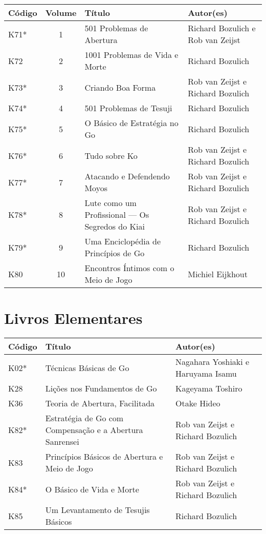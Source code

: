 \begin{longtable}{l|c|p{45mm}|p{25mm}} 
    \hline
    \textbf{Código} & \textbf{Volume} & \textbf{Título} & \textbf{Autor(es)} \\
    \hline \hline
    K71* & 1 & 501 Problemas de Abertura & Richard Bozulich e Rob van Zeijst \\
    \hline
    K72 & 2 & 1001 Problemas de Vida e Morte & Richard Bozulich \\
    \hline
    K73* & 3 & Criando Boa Forma & Rob van Zeijst e Richard Bozulich \\
    \hline
    K74* & 4 & 501 Problemas de Tesuji & Richard Bozulich \\
    \hline
    K75* & 5 & O Básico de Estratégia no Go & Richard Bozulich \\
    \hline
    K76* & 6 & Tudo sobre Ko & Rob van Zeijst e Richard Bozulich \\
    \hline
    K77* & 7 & Atacando e Defendendo Moyos & Rob van Zeijst e Richard Bozulich \\
    \hline
    K78* & 8 & Lute como um Profissional --- Os Segredos do Kiai & Rob van Zeijst e Richard Bozulich \\
    \hline
    K79* & 9 & Uma Enciclopédia de Princípios de Go & Richard Bozulich \\
    \hline
    K80 & 10 & Encontros Íntimos com o Meio de Jogo & Michiel Eijkhout \\
    \hline
\end{longtable}

\section{Livros Elementares}

\begin{longtable}{l|p{45mm}|p{25mm}} 
    \hline
    \textbf{Código} & \textbf{Título} & \textbf{Autor(es)} \\
    \hline \hline
    K02* & Técnicas Básicas de Go & Nagahara Yoshiaki e Haruyama Isamu \\
    \hline
    K28 & Lições nos Fundamentos de Go & Kageyama Toshiro \\
    \hline
    K36 & Teoria de Abertura, Facilitada & Otake Hideo \\
    \hline
    K82* & Estratégia de Go com Compensação e a Abertura Sanrensei & Rob van Zeijst e Richard Bozulich \\
    \hline
    K83 & Princípios Básicos de Abertura e Meio de Jogo & Rob van Zeijst e Richard Bozulich \\
    \hline
    K84* & O Básico de Vida e Morte & Rob van Zeijst e Richard Bozulich \\
    \hline
    K85 & Um Levantamento de Tesujis Básicos & Richard Bozulich \\
    \hline
\end{longtable}

